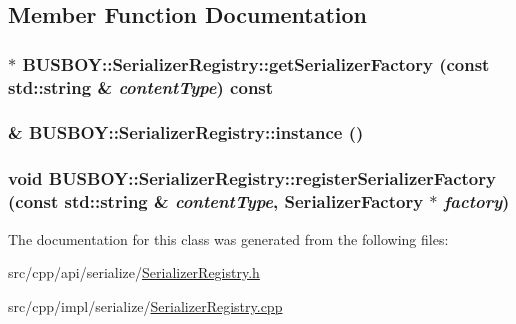 \subsection{Member Function Documentation}
\hypertarget{classBUSBOY_1_1SerializerRegistry_ac0afae4f4ea9bb93d0fab518a9a801da}{
\subsubsection[{getSerializerFactory}]{ $\ast$ BUSBOY::SerializerRegistry::getSerializerFactory (const std::string \& {\em contentType}) const}}
\label{classBUSBOY_1_1SerializerRegistry_ac0afae4f4ea9bb93d0fab518a9a801da}
\hypertarget{classBUSBOY_1_1SerializerRegistry_a680fd6bd55dd2cda503f6c86e1b45848}{
\subsubsection[{instance}]{ \& BUSBOY::SerializerRegistry::instance ()}}
\label{classBUSBOY_1_1SerializerRegistry_a680fd6bd55dd2cda503f6c86e1b45848}
\hypertarget{classBUSBOY_1_1SerializerRegistry_aa380f8203820578477b1b0a6098683e3}{
\subsubsection[{registerSerializerFactory}]{\setlength{\rightskip}{0pt plus 5cm}void BUSBOY::SerializerRegistry::registerSerializerFactory (const std::string \& {\em contentType}, \/  {\bf SerializerFactory} $\ast$ {\em factory})}}
\label{classBUSBOY_1_1SerializerRegistry_aa380f8203820578477b1b0a6098683e3}


The documentation for this class was generated from the following files:\begin{DoxyCompactItemize}
\item 
src/cpp/api/serialize/\hyperlink{SerializerRegistry_8h}{SerializerRegistry.h}\item 
src/cpp/impl/serialize/\hyperlink{SerializerRegistry_8cpp}{SerializerRegistry.cpp}\end{DoxyCompactItemize}
